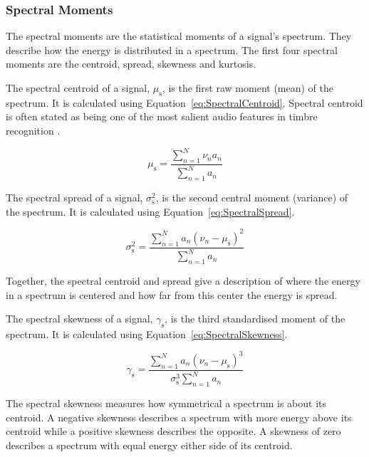 		\subsubsection*{Spectral Moments}
			The spectral moments are the statistical moments of a signal's spectrum. They describe how the
			energy is distributed in a spectrum. The first four spectral moments are the centroid, spread,
			skewness and kurtosis.

			The spectral centroid of a signal, $\mu_{\mathrm{s}}$, is the first raw moment (mean) of the
			spectrum. It is calculated using Equation~\ref{eq:SpectralCentroid}. Spectral centroid is often
			stated as being one of the most salient audio features in timbre recognition
			\citep{freed1990auditory, lakatos2000a}. 

			\begin{equation}
				\mu_{\mathrm{s}} = \frac{\sum_{n = 1}^{N} \nu_{n}a_{n}}
					   	   {\sum_{n = 1}^{N} a_{n}}
				\label{eq:SpectralCentroid}
			\end{equation}

			The spectral spread of a signal, $\sigma_{\mathrm{s}}^{2}$, is the second central moment (variance)
			of the spectrum. It is calculated using Equation~\ref{eq:SpectralSpread}.

			\begin{equation}
				\sigma_{\mathrm{s}}^{2} = \frac{\sum_{n = 1}^{N} a_{n}(\nu_{n} - \mu_{\mathrm{s}})^{2}}
						  	  {\sum_{n = 1}^{N} a_{n}}
				\label{eq:SpectralSpread}
			\end{equation}

			Together, the spectral centroid and spread give a description of where the energy in a spectrum is
			centered and how far from this center the energy is spread.

			The spectral skewness of a signal, $\gamma_{\mathrm{s}}$, is the third standardised moment of the
			spectrum. It is calculated using Equation~\ref{eq:SpectralSkewness}.

			\begin{equation}
				\gamma_{\mathrm{s}} = \frac{\sum_{n = 1}^{N} a_{n}(\nu_{n} - \mu_{\mathrm{s}})^{3}}
					{\sigma_{\mathrm{s}}^{3}\sum_{n = 1}^{N} a_{n}}
				\label{eq:SpectralSkewness}
			\end{equation}

			The spectral skewness measures how symmetrical a spectrum is about its centroid. A negative
			skewness describes a spectrum with more energy above its centroid while a positive skewness
			describes the opposite. A skewness of zero describes a spectrum with equal energy either side of
			its centroid.

